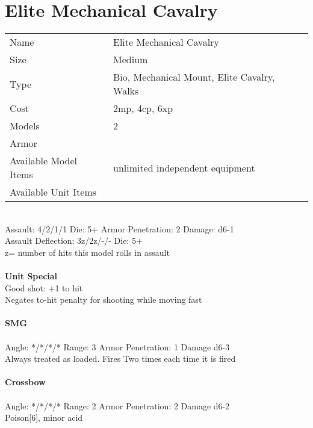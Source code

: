 






\pagebreak

\section{ Elite Mechanical Cavalry }

\begin{tabular}{ll}
  Name & Elite Mechanical Cavalry \\
  Size & Medium\\
  Type & Bio, Mechanical Mount, Elite Cavalry, Walks\\
  Cost & 2mp, 4cp, 6xp\\
  Models & 2\\
  Armor & \\
  Available Model Items & unlimited independent equipment \\
  Available Unit Items &  \\
\end{tabular}

\ \\
Assault: 4/2/1/1 Die: 5+ Armor Penetration: 2 Damage: d6-1 \\
Assault Deflection: 3z/2z/-/- Die: 5+\\
\indent z= number of hits this model rolls in assault \\
\ \\

{\bf Unit Special} \\
Good shot: +1 to hit \\ Negates to-hit penalty for shooting while moving fast
\ \\
\ \\
{\bf SMG } \\
\ \\
Angle: */*/*/* Range: 3 Armor Penetration: 1 Damage d6-3 \\
\indent Always treated as loaded. Fires Two times each time it is fired \\



\ \\
{\bf Crossbow } \\
\ \\
Angle: */*/*/* Range: 2 Armor Penetration: 2 Damage d6-2 \\
\indent Poison[6], minor acid \\





